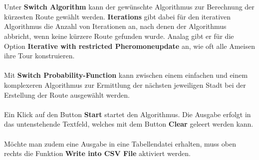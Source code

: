 \documentclass[doktyp=barbeit, sprache=german]{TUBAFarbeiten}
\begin{document}
\\\\Unter \textbf{Switch Algorithm} kann der gewünschte Algorithmus zur Berechnung der kürzesten Route gewählt werden. \textbf{Iterations} gibt dabei für den iterativen Algorithmus die Anzahl von Iterationen an, nach denen der Algorithmus abbricht, wenn keine kürzere Route gefunden wurde. Analag gibt er für die Option \textbf{Iterative with restricted Pheromoneupdate} an, wie oft alle Ameisen ihre Tour konstruieren.
\\\\Mit \textbf{Switch Probability-Function} kann zwischen einem einfachen und einem komplexeren Algorithmus zur Ermittlung der nächsten jeweiligen Stadt bei der Erstellung der Route ausgewählt werden.
\\\\Ein Klick auf den Button \textbf{Start} startet den Algorithmus. Die Ausgabe erfolgt in das untenstehende Textfeld, welches mit dem Button \textbf{Clear} geleert werden kann.
\\\\Möchte man zudem eine Ausgabe in eine Tabellendatei erhalten, muss oben rechts die Funktion \textbf{Write into CSV File} aktiviert werden.
\newpage
\end{document}
